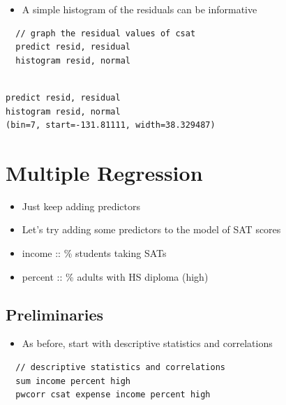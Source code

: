 \documentclass[]{book}
\providecommand{\tightlist}{%
  \setlength{\itemsep}{0pt}\setlength{\parskip}{0pt}}
\begin{document}
\begin{itemize}
\tightlist
\item
  A simple histogram of the residuals can be informative
\end{itemize}

\begin{verbatim}
  // graph the residual values of csat
  predict resid, residual
  histogram resid, normal 
\end{verbatim}

\begin{verbatim}

predict resid, residual
histogram resid, normal
(bin=7, start=-131.81111, width=38.329487)
\end{verbatim}

\hypertarget{multiple-regression}{%
\section{Multiple Regression}\label{multiple-regression}}

\begin{itemize}
\tightlist
\item
  Just keep adding predictors
\item
  Let's try adding some predictors to the model of SAT scores
\item
  income :: \% students taking SATs
\item
  percent :: \% adults with HS diploma (high)
\end{itemize}

\hypertarget{preliminaries-1}{%
\subsection{Preliminaries}\label{preliminaries-1}}

\begin{itemize}
\tightlist
\item
  As before, start with descriptive statistics and correlations
\end{itemize}

\begin{verbatim}
  // descriptive statistics and correlations
  sum income percent high
  pwcorr csat expense income percent high
\end{verbatim}
\end{document}
